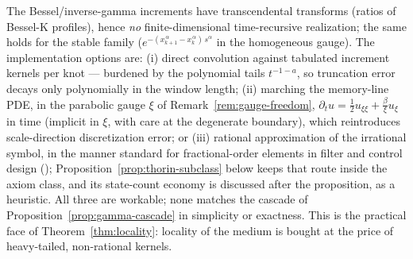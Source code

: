 \begin{remark}\label{rem:local-implementation}
The Bessel/inverse-gamma increments have transcendental transforms (ratios of Bessel-K
profiles), hence \emph{no} finite-dimensional time-recursive realization; the same holds for
the stable family ($e^{-(x_{k+1}^{\,\alpha} - x_k^{\,\alpha})\,s^\alpha}$ in the homogeneous
gauge). The implementation options are: (i) direct convolution against tabulated increment
kernels per knot --- burdened by the polynomial tails $t^{-1-a}$, so truncation error decays
only polynomially in the window length; (ii) marching the memory-line PDE, in the parabolic
gauge $\xi$ of Remark~\ref{rem:gauge-freedom},
$\partial_t u = \tfrac12 u_{\xi\xi} + \tfrac{\beta}{\xi}u_\xi$ in time (implicit in $\xi$, with
care at the degenerate boundary), which reintroduces scale-direction discretization error; or
(iii)
rational approximation of the irrational symbol, in the manner standard for
fractional-order elements in filter and control design ();
Proposition~\ref{prop:thorin-subclass} below keeps that route inside the axiom class, and
its state-count economy is discussed after the proposition, as a heuristic. All three
are workable; none matches the cascade of Proposition~\ref{prop:gamma-cascade} in simplicity
or exactness. This is the practical face of Theorem~\ref{thm:locality}: locality of the
medium is bought at the price of heavy-tailed, non-rational kernels.
\end{remark}


